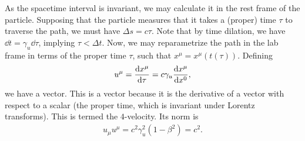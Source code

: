 As the spacetime interval is invariant, we may calculate it in the rest frame of the particle. Supposing that the particle measures that it takes a (proper) time $\tau$ to traverse the path, we must have $\Delta s = c\tau$. Note that by time dilation, we have $\dd{t} = \gamma_{u}\dd{\tau}$, implying $\tau < \Delta t$. Now, we may reparametrize the path in the lab frame in terms of the proper time $\tau$, such that $x^{\mu} = x^{\mu}(t(\tau))$. Defining
\begin{align*}
	u^{\mu} = \dv{x^{\mu}}{\tau} = c\gamma_{u}\dv{x^{\mu}}{x^{0}},
\end{align*}
we have a vector. This is a vector because it is the derivative of a vector with respect to a scalar (the proper time, which is invariant under Lorentz transforms). This is termed the $4$-velocity. Its norm is
\begin{align*}
	u_{\mu}u^{\mu} = c^{2}\gamma_{u}^{2}(1 - \beta^{2}) = c^{2}.
\end{align*}

